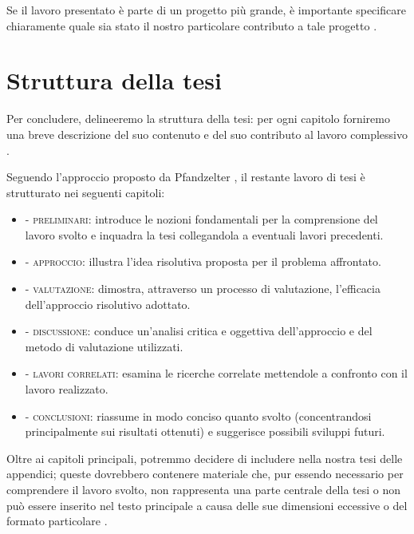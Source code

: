 \medskip

Se il lavoro presentato è parte di un progetto più grande, è importante specificare chiaramente quale sia stato il nostro particolare contributo a tale progetto \cite{tuni2019guide}.

\section{Struttura della tesi}

Per concludere, delineeremo la struttura della tesi: per ogni capitolo forniremo una breve descrizione del suo contenuto e del suo contributo al lavoro complessivo \cite{tuni2019guide}.

\medskip

Seguendo l'approccio proposto da Pfandzelter \etAl \cite{pfandzelter2022thesis}, il restante lavoro di tesi è strutturato nei seguenti capitoli:

\begin{itemize}

\item {} - \textsc{preliminari}: introduce le nozioni fondamentali per la comprensione del lavoro svolto e inquadra la tesi collegandola a eventuali lavori precedenti.

\item {} - \textsc{approccio}: illustra l'idea risolutiva proposta per il problema affrontato.

\item {} - \textsc{valutazione}: dimostra, attraverso un processo di valutazione, l'efficacia dell'approccio risolutivo adottato.

\item {} - \textsc{discussione}: conduce un'analisi critica e oggettiva dell'approccio e del metodo di valutazione utilizzati.

\item {} - \textsc{lavori correlati}: esamina le ricerche correlate mettendole a confronto con il lavoro realizzato.

\item {} - \textsc{conclusioni}: riassume in modo conciso quanto svolto (concentrandosi principalmente sui risultati ottenuti) e suggerisce possibili sviluppi futuri.

\end{itemize}

Oltre ai capitoli principali, potremmo decidere di includere nella nostra tesi delle appendici; 
queste dovrebbero contenere materiale che, pur essendo necessario per comprendere il lavoro svolto, non rappresenta una parte centrale della tesi o non può essere inserito nel testo principale a causa delle sue dimensioni eccessive o del formato particolare \cite{tuni2019guide}.

